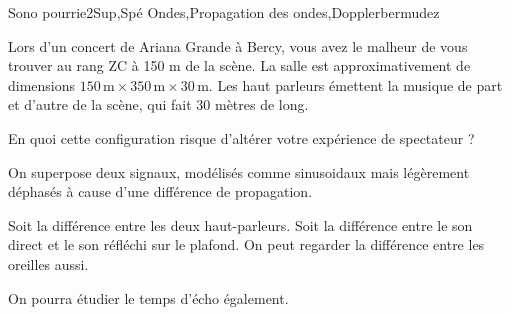 
\begin{exercise}{Sono pourrie}{2}{Sup,Spé}
{Ondes,Propagation des ondes,Doppler}{bermudez}

\noindent{}

Lors d'un concert de Ariana Grande à Bercy, vous avez le malheur de vous trouver au rang ZC à 150 m de la scène. La salle est approximativement de dimensions $\mathrm{150\,m\times 350\,m \times 30\,m}$. Les haut parleurs émettent la musique de part et d'autre de la scène, qui fait 30 mètres de long.

En quoi cette configuration risque d'altérer votre expérience de spectateur ?

\end{exercise}

\begin{solution}

On superpose deux signaux, modélisés comme sinusoidaux mais légèrement déphasés à cause d'une différence de propagation.

Soit la différence entre les deux haut-parleurs. Soit la différence entre le son direct et le son réfléchi sur le plafond. On peut regarder la différence entre les oreilles aussi.

On pourra étudier le temps d'écho également.
\end{solution}